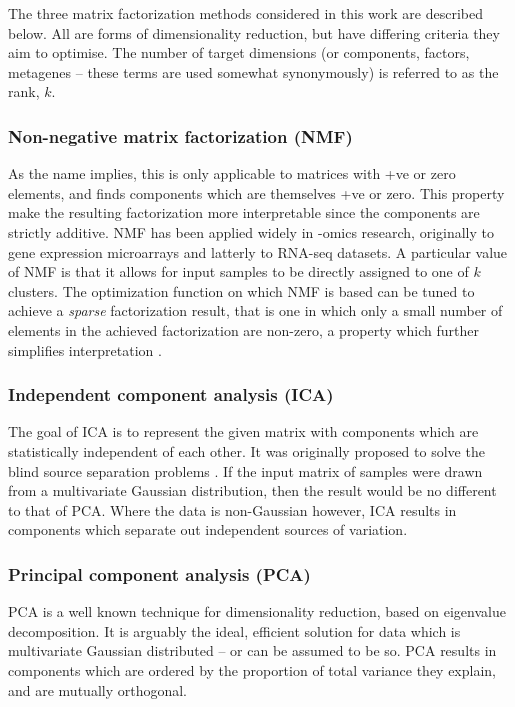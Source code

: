 \documentclass[tikz, 11pt,a4paper,oneside,fleqn]{article}
\begin{document}
The three matrix factorization methods considered in this work are described below.  All are forms of dimensionality reduction, but have differing criteria they aim to optimise.  The number of target dimensions (or components, factors, metagenes -- these terms are used somewhat synonymously) is referred to as the rank, $k$.
\subsubsection{Non-negative matrix factorization (NMF)}
\label{sec-nmf}
As the name implies, this is only applicable to matrices with +ve or zero elements, and finds components which are themselves +ve or zero.   This property make the resulting factorization more interpretable since the components are strictly additive.   
NMF has been applied widely in -omics research, originally to gene expression microarrays  and latterly to RNA-seq datasets.  
A particular value of NMF is that it allows for input samples to be directly assigned to one of $k$ clusters.   
The optimization function on which NMF is based can be tuned to achieve a \emph{sparse} factorization result, that is one in which only a small number of elements in the achieved factorization are non-zero, a property which further simplifies interpretation \cite{Brunet2004}.
%
\subsubsection{Independent component analysis (ICA)} 
The goal of ICA is to represent the given matrix with components which are statistically independent of each other.  It was originally proposed to solve the blind source separation problems \cite{Comon1994}. If the input matrix of samples were drawn from a multivariate Gaussian distribution, then the result would be no different to that of PCA.    Where the data is non-Gaussian however, ICA results in components which separate out independent sources of variation.  

\subsubsection{Principal component analysis (PCA)}
PCA is a well known technique for dimensionality reduction, based on eigenvalue decomposition.  It is arguably the ideal, efficient solution for data which is multivariate Gaussian distributed -- or can be assumed to be so.  PCA results in components which are ordered by the proportion of total variance they explain, and are mutually orthogonal.
\end{document}
